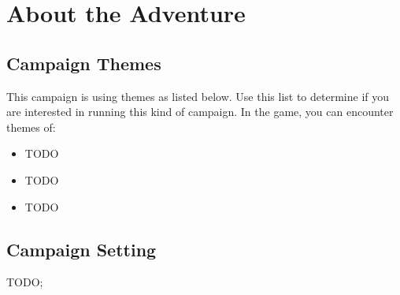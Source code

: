 \section{About the Adventure}


\subsection{Campaign Themes}

This campaign is using themes as listed below. Use this list to determine if you are interested in running this kind of campaign. In the game, you can encounter themes of:
\begin{itemize}
	\item TODO
	\item TODO
	\item TODO
\end{itemize}

\subsection{Campaign Setting}

TODO; \lipsum[1][1-5]
